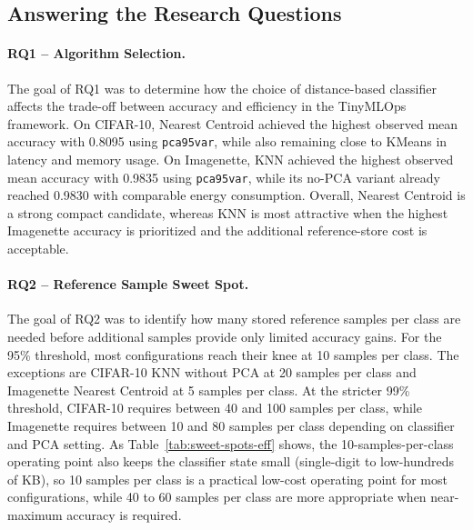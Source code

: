 \documentclass[sigconf,review,nonacm]{acmart}
\begin{document}
\subsection{Answering the Research Questions}
\paragraph{RQ1 -- Algorithm Selection.}
The goal of RQ1 was to determine how the choice of distance-based classifier affects the trade-off between accuracy and efficiency in the TinyMLOps framework.
On CIFAR-10, Nearest Centroid achieved the highest observed mean accuracy with 0.8095 using \texttt{pca95var}, while also remaining close to KMeans in latency and memory usage.
On Imagenette, KNN achieved the highest observed mean accuracy with 0.9835 using \texttt{pca95var}, while its no-PCA variant already reached 0.9830 with comparable energy consumption.
Overall, Nearest Centroid is a strong compact candidate, whereas KNN is most attractive when the highest Imagenette accuracy is prioritized and the additional reference-store cost is acceptable.

\paragraph{RQ2 -- Reference Sample Sweet Spot.}
The goal of RQ2 was to identify how many stored reference samples per class are needed before additional samples provide only limited accuracy gains.
For the 95\% threshold, most configurations reach their knee at 10 samples per class. The exceptions are CIFAR-10 KNN without PCA at 20 samples per class and Imagenette Nearest Centroid at 5 samples per class.
At the stricter 99\% threshold, CIFAR-10 requires between 40 and 100 samples per class, while Imagenette requires between 10 and 80 samples per class depending on classifier and PCA setting.
As Table~\ref{tab:sweet-spots-eff} shows, the 10-samples-per-class operating point also keeps the classifier state small (single-digit to low-hundreds of KB), so 10 samples per class is a practical low-cost operating point for most configurations, while 40 to 60 samples per class are more appropriate when near-maximum accuracy is required.
\end{document}
